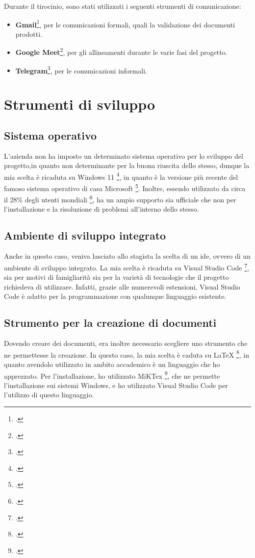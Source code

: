 Durante il tirocinio, sono stati utilizzati i seguenti strumenti di comunicazione:
\begin{itemize}
    \item \textbf{Gmail}\footcite{site:gmail}, per le comunicazioni formali, quali la validazione dei documenti prodotti.
    \item \textbf{Google Meet}\footcite{site:meet}, per gli allineamenti durante le varie fasi del progetto.
    \item \textbf{Telegram}\footcite{site:telegram}, per le comunicazioni informali.
\end{itemize}

\section{Strumenti di sviluppo}
\label{sec:sviluppoStrum}
\subsection{Sistema operativo}
L'azienda non ha imposto un determinato sistema operativo per lo sviluppo del progetto,in quanto non determinante per la buona riuscita dello stesso, dunque la mia scelta è ricaduta su Windows 11 \footcite{site:w11}, in quanto è la versione più recente del famoso sistema operativo di casa Microsoft \footcite{site:microsoft}. Inoltre, essendo utilizzato da circa il 28\% degli utenti mondiali \footcite{site:statOS}, ha un ampio supporto sia ufficiale che non per l'installazione e la risoluzione di problemi all'interno dello stesso.
\subsection{Ambiente di sviluppo integrato}
Anche in questo caso, veniva lasciato allo stagista la scelta di un \gls{ide}, ovvero di un ambiente di sviluppo integrato. La mia scelta è ricaduta su Visual Studio Code \footcite{site:vscode}, sia per motivi di famigliarità sia per la varietà di tecnologie che il progetto richiedeva di utilizzare. Infatti, grazie alle numerevoli estensioni, Visual Studio Code è adatto per la programmazione con qualunque linguaggio esistente.
\subsection{Strumento per la creazione di documenti}
Dovendo creare dei documenti, era inoltre necessario scegliere uno strumento che ne permettesse la creazione. In questo caso, la mia scelta è caduta su LaTeX \footcite{site:latex}, in quanto avendolo utilizzato in ambito accademico è un linguaggio che ho apprezzato. Per l'installazione, ho utilizzato MiKTex \footcite{site:miktex}, che ne permette l'installazione sui sistemi Windows, e ho utilizzato Visual Studio Code per l'utilizzo di questo linguaggio.

